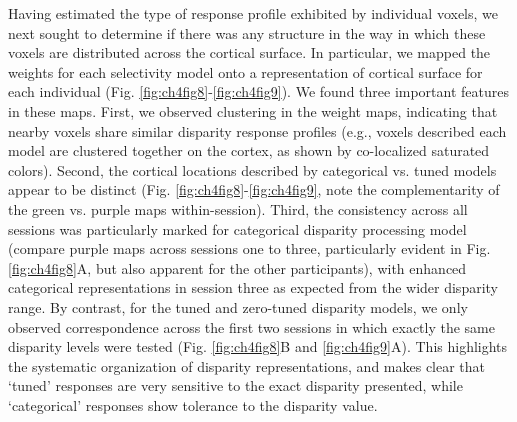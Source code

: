 Having estimated the type of response profile exhibited by individual voxels, we next sought to determine if there was any structure in the way in which these voxels are distributed across the cortical surface. In particular, we mapped the weights for each selectivity model onto a representation of cortical surface for each individual (Fig. \ref{fig:ch4fig8}-\ref{fig:ch4fig9}). We found three important features in these maps. First, we observed clustering in the weight maps, indicating that nearby voxels share similar disparity response profiles (e.g., voxels described each model are clustered together on the cortex, as shown by co-localized saturated colors). Second, the cortical locations described by categorical vs. tuned models appear to be distinct (Fig. \ref{fig:ch4fig8}-\ref{fig:ch4fig9}, note the complementarity of the green vs. purple maps within-session). Third, the consistency across all sessions was particularly marked for categorical disparity processing model (compare purple maps across sessions one to three, particularly evident in Fig. \ref{fig:ch4fig8}A, but also apparent for the other participants), with enhanced categorical representations in session three as expected from the wider disparity range. By contrast, for the tuned and zero-tuned disparity models, we only observed correspondence across the first two sessions in which exactly the same disparity levels were tested (Fig. \ref{fig:ch4fig8}B and \ref{fig:ch4fig9}A). This highlights the systematic organization of disparity representations, and makes clear that `tuned' responses are very sensitive to the exact disparity presented, while `categorical' responses show tolerance to the disparity value.

